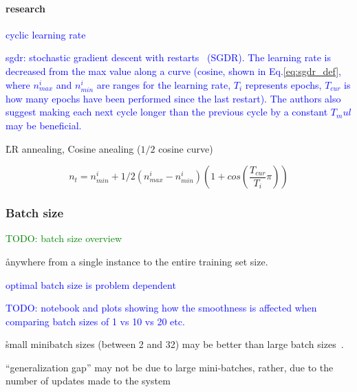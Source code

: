\paragraph{research}


\textcolor{blue}{cyclic learning rate~\cite{smith2017cyclical}}

\textcolor{blue}{sgdr: stochastic gradient descent with restarts~\cite{loshchilov2016sgdr} (SGDR). The learning rate is decreased from the max value along a curve (cosine, shown in Eq.\ref{eq:sgdr_def}, where $n_{max}^i$ and $n_{min}^i$ are ranges for the learning rate, $T_i$ represents epochs, $T_{cur}$ is how many epochs have been performed since the last restart). The authors also suggest making each next cycle longer than the previous cycle by a constant $T_mul$ may be beneficial.}

\r{LR annealing, Cosine anealing ($1/2$ cosine curve)}


\begin{equation}
{n_t = n_{min}^i + 1/2(n_{max}^i - n_{min}^i)(1 + cos(\frac{T_{cur}}{T_i}\pi))}
\label{eq:sgdr_def}
\end{equation}

\subsubsection{Batch size}

\textcolor{green}{TODO: batch size overview}

\r{anywhere from a single instance to the entire training set size.}

\textcolor{blue}{optimal batch size is problem dependent}

\textcolor{blue}{TODO: notebook and plots showing how the smoothness is affected when comparing batch sizes of 1 vs 10 vs 20 etc.}


\r{small minibatch sizes (between 2 and 32) may be better than large batch sizes~\cite{masters2018revisiting}.}

\r{``generalization gap'' may not be due to large mini-batches, rather, due to the number of updates made to the system~\cite{hoffer2017train}}

